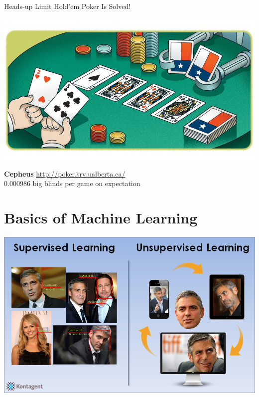 \documentclass{beamer}
\begin{document}
  {
    \begin{frame}{Heads-up Limit Hold’em Poker Is Solved!}
      \begin{center}
        \includegraphics[width=\textwidth, keepaspectratio]{../img/limit_holdem_poker.jpg}
        \pause

        \textbf{Cepheus} \url{http://poker.srv.ualberta.ca/} \\
        {\tiny 0.000986 big blinds per game on expectation}
      \end{center}
    \end{frame}
  }


  \section{Basics of Machine Learning}

  {
    \begin{frame}[standout]
      \includegraphics[width=\textwidth]{../img/SL_vs_UL_George_Clooney.png}
    \end{frame}
  }
\end{document}
